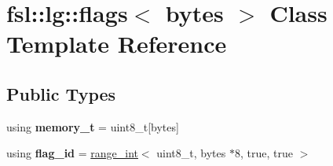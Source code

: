 \hypertarget{classfsl_1_1lg_1_1flags}{}\section{fsl\+::lg\+::flags$<$ bytes $>$ Class Template Reference}
\label{classfsl_1_1lg_1_1flags}
\subsection*{Public Types}
\begin{DoxyCompactItemize}
\item 
\mbox{\label{classfsl_1_1lg_1_1flags_a84c2aecbb7f7651624c9ec437d682d60}} 
using {\bfseries memory\+\_\+t} = uint8\+\_\+t\mbox{[}bytes\mbox{]}
\item 
\mbox{\label{classfsl_1_1lg_1_1flags_a56b025fbf1464b5c9c532b6f746c5f18}} 
using {\bfseries flag\+\_\+id} = \mbox{\hyperlink{classfsl_1_1lg_1_1range__int}{range\+\_\+int}}$<$ uint8\+\_\+t, bytes $\ast$8, true, true $>$
\end{DoxyCompactItemize}
